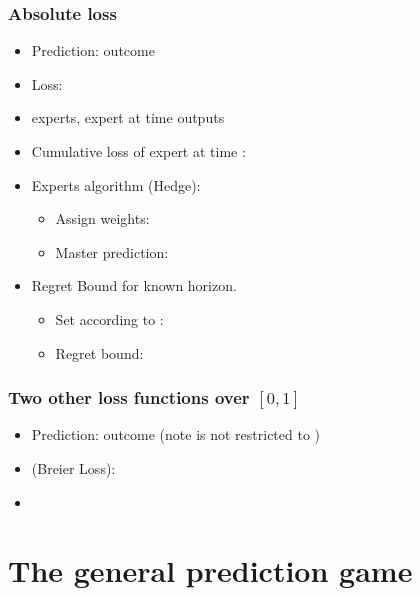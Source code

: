\documentclass[handout]{beamer}
\begin{document}
\begin{frame}
\frametitle{Absolute loss}
\begin{itemize}
\item Prediction:  outcome 
\item Loss: 
\item {} experts, expert  at time  outputs 
\item Cumulative loss of expert  at time : 
\item Experts algorithm (Hedge):
  \begin{itemize}
    \item Assign weights: 
    \item Master prediction:
  \end{itemize}
\item Regret Bound for known horizon.
  \begin{itemize}
  \item Set \R{$\eta$} according to :
  \item Regret bound:
  \end{itemize}
\end{itemize}
\end{frame}

\begin{frame}
\frametitle{Two other loss functions over $[0,1]$}
\begin{itemize}
\item Prediction:  outcome  (note
   is not restricted to )
\item {} (Breier Loss): 
\item {} 
\end{itemize}
\end{frame}

\section{The general prediction game}
\end{document}
